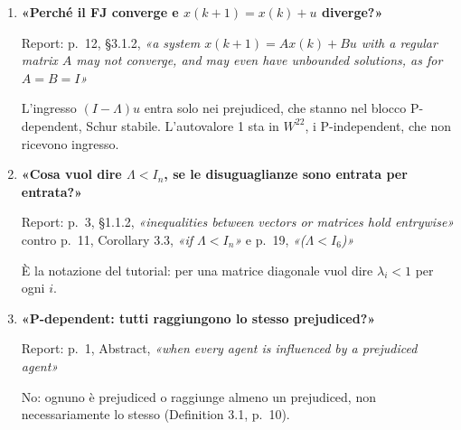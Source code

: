 \documentclass[a4paper,10pt]{article}
\newcommand{\D}[3]{\item \textbf{«#1»}\par{\small\color{gray}Report: #2}\par #3}
\newcommand{\R}[2]{#1, \textit{«#2»}}
\begin{document}
\begin{enumerate}[resume*=fj]
  \D{Perché il FJ converge e $x(k+1)=x(k)+u$ diverge?}
  {\R{p.~12, §3.1.2}{a system $x(k+1) = Ax(k) + Bu$ with a regular matrix $A$ may not converge, and may even have unbounded solutions, as for $A = B = I$}}
  {L'ingresso $(I-\Lambda)u$ entra solo nei prejudiced, che stanno nel blocco P-dependent, Schur stabile. L'autovalore 1 sta in $W^{22}$, i P-independent, che non ricevono ingresso.}
  \D{Cosa vuol dire $\Lambda<I_n$, se le disuguaglianze sono entrata per entrata?}
  {\R{p.~3, §1.1.2}{inequalities between vectors or matrices hold entrywise} contro \R{p.~11, Corollary 3.3}{if $\Lambda < I_n$} e \R{p.~19}{($\Lambda < I_6$)}}
  {È la notazione del tutorial: per una matrice diagonale vuol dire $\lambda_i<1$ per ogni $i$.}
  \D{P-dependent: tutti raggiungono lo stesso prejudiced?}
  {\R{p.~1, Abstract}{when every agent is influenced by a prejudiced agent}}
  {No: ognuno è prejudiced o raggiunge almeno un prejudiced, non necessariamente lo stesso (Definition 3.1, p.~10).}
\end{enumerate}
\end{document}
